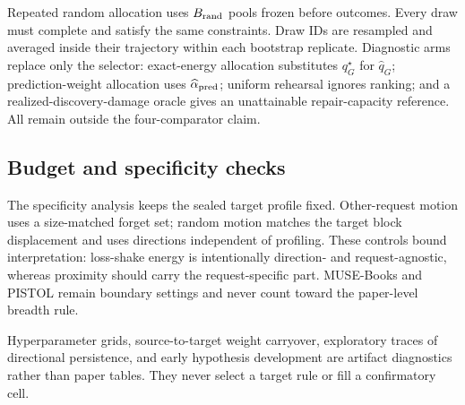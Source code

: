 Repeated random allocation uses $B_{\rm rand}$ pools frozen before outcomes.
Every draw must complete and satisfy the same constraints. Draw IDs are
resampled and averaged inside their trajectory within each bootstrap
replicate. Diagnostic arms replace only the selector: exact-energy allocation
substitutes $q_G^\star$ for $\widehat q_G$; prediction-weight allocation uses
$\widehat\alpha_{\rm pred}$; uniform rehearsal ignores ranking; and a
realized-discovery-damage oracle gives an unattainable repair-capacity
reference. All remain outside the four-comparator claim.

\subsection{Budget and specificity checks}
\label{app:specificity}

The specificity analysis keeps the sealed target profile fixed. Other-request
motion uses a size-matched forget set; random motion matches the target block
displacement and uses directions independent of profiling. These controls
bound interpretation: loss-shake energy is intentionally direction- and
request-agnostic, whereas proximity should carry the request-specific part.
MUSE-Books and PISTOL remain boundary settings and never count toward the
paper-level breadth rule.

Hyperparameter grids, source-to-target weight carryover, exploratory traces of
directional persistence, and early hypothesis development are artifact
diagnostics rather than paper tables. They never select a target rule or fill
a confirmatory cell.

